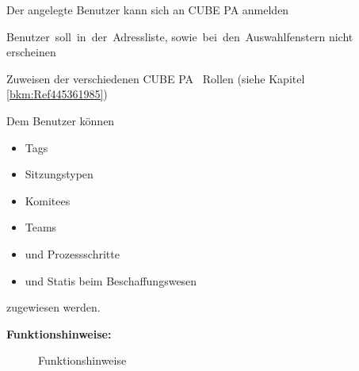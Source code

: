 \begin{small}
\begin{raggedright}

Der angelegte Benutzer kann sich an CUBE PA anmelden

\vspace{\baselineskip}

\mbox{Benutzer soll in der Adressliste,} 
\mbox{sowie bei den Auswahlfenstern}
nicht erscheinen

\vspace{\baselineskip}

Zuweisen der verschiedenen CUBE PA \
Rollen (siehe Kapitel \ref{bkm:Ref445361985})

\vspace{\baselineskip}
\vspace{\baselineskip}
\vspace{\baselineskip}

Dem Benutzer können

\vspace{\baselineskip}

\begin{itemize}
\item Tags
\vspace{\baselineskip}
\vspace{\baselineskip}
\item Sitzungstypen
\vspace{\baselineskip}
\item Komitees
\item Teams
\item und Prozessschritte
\item und Statis beim \newline Beschaffungswesen
\end{itemize}

\vspace{\baselineskip}

zugewiesen werden.

\end{raggedright}
\end{small}

\raggedright{}

\clearpage
\textbf{Funktionshinweise:}

\begin{figure}[H]
\caption{Funktionshinweise}
\end{figure}

